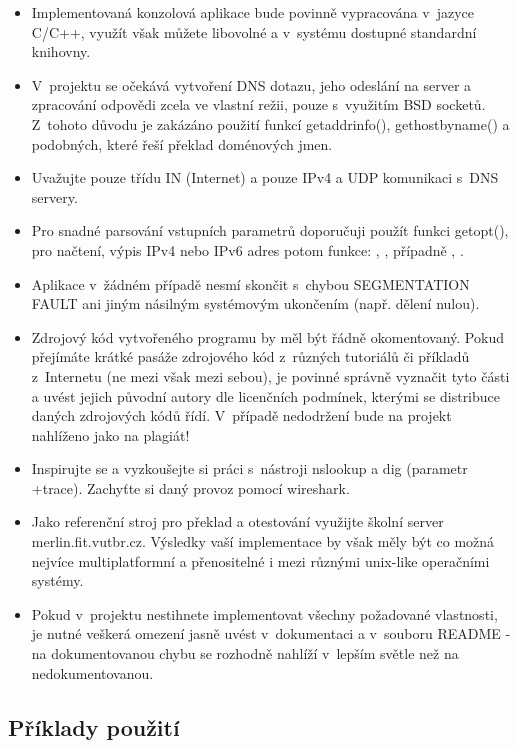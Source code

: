 \documentclass[11pt, a4paper, titlepage]{article}
\begin{document}
\begin{itemize}
	\item Implementovaná konzolová aplikace bude povinně vypracována v~jazyce C/C++, využít však můžete libovolné a v~systému dostupné standardní knihovny.
	\item V~projektu se očekává vytvoření DNS dotazu, jeho odeslání na server a zpracování odpovědi zcela ve vlastní režii, pouze s~využitím BSD socketů. Z~tohoto důvodu je zakázáno použití funkcí getaddrinfo(), gethostbyname() a podobných, které řeší překlad doménových jmen.
	\item Uvažujte pouze třídu IN (Internet) a pouze IPv4 a UDP komunikaci s~DNS servery.
	\item Pro snadné parsování vstupních parametrů doporučuji použít funkci getopt(), pro načtení, výpis IPv4 nebo IPv6 adres potom funkce: , , případně , .
	\item Aplikace v~žádném případě nesmí skončit s~chybou SEGMENTATION FAULT ani jiným násilným systémovým ukončením (např. dělení nulou).
	\item Zdrojový kód vytvořeného programu by měl být řádně okomentovaný. Pokud přejímáte krátké pasáže zdrojového kód z~různých tutoriálů či příkladů z~Internetu (ne mezi však mezi sebou), je povinné správně vyznačit tyto části a uvést jejich původní autory dle licenčních podmínek, kterými se distribuce daných zdrojových kódů řídí. V~případě nedodržení bude na projekt nahlíženo jako na plagiát!
	\item Inspirujte se a vyzkoušejte si práci s~nástroji nslookup a dig (parametr +trace). Zachyťte si daný provoz pomocí wireshark.
	\item Jako referenční stroj pro překlad a otestování využijte školní server merlin.fit.vutbr.cz. Výsledky vaší implementace by však měly být co možná nejvíce multiplatformní a přenositelné i mezi různými unix-like operačními systémy.
	\item Pokud v~projektu nestihnete implementovat všechny požadované vlastnosti, je nutné veškerá omezení jasně uvést v~dokumentaci a v~souboru README - na dokumentovanou chybu se rozhodně nahlíží v~lepším světle než na nedokumentovanou.
\end{itemize}



\subsection*{Příklady použití}
\end{document}
